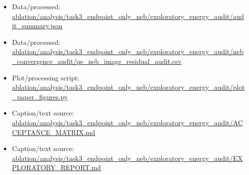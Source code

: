 \begin{itemize}[leftmargin=1.4em,noitemsep]
\item Data/processed: \begingroup\scriptsize\url{ablation/analysis/task3_endpoint_only_neb/exploratory_energy_audit/audit_summary.json}\endgroup
\item Data/processed: \begingroup\scriptsize\url{ablation/analysis/task3_endpoint_only_neb/exploratory_energy_audit/neb_convergence_audit/qe_neb_image_residual_audit.csv}\endgroup
\item Plot/processing script: \begingroup\scriptsize\url{ablation/analysis/task3_endpoint_only_neb/exploratory_energy_audit/plot_paper_figures.py}\endgroup
\item Caption/text source: \begingroup\scriptsize\url{ablation/analysis/task3_endpoint_only_neb/exploratory_energy_audit/ACCEPTANCE_MATRIX.md}\endgroup
\item Caption/text source: \begingroup\scriptsize\url{ablation/analysis/task3_endpoint_only_neb/exploratory_energy_audit/EXPLORATORY_REPORT.md}\endgroup
\end{itemize}
